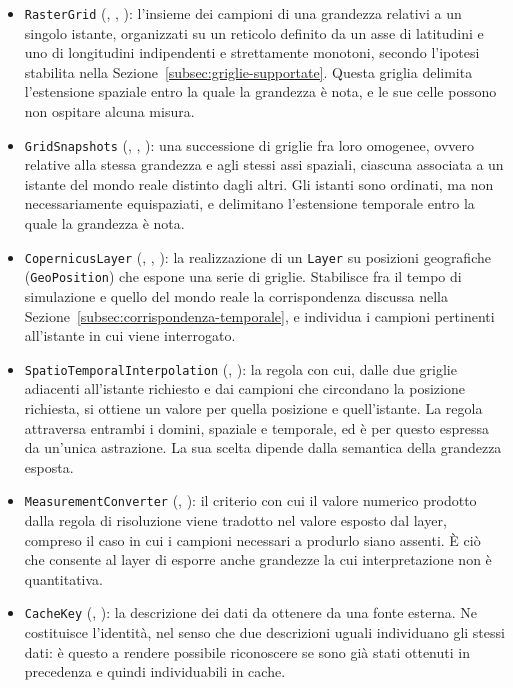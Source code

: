 \begin{itemize}
    \item \texttt{RasterGrid} (, , ): l'insieme dei campioni di una
    grandezza relativi a un singolo istante, organizzati su un reticolo definito da un asse
    di latitudini e uno di longitudini indipendenti e strettamente monotoni, secondo
    l'ipotesi stabilita nella Sezione~\ref{subsec:griglie-supportate}. Questa griglia
    delimita l'estensione spaziale entro la quale la grandezza è nota, e le sue celle
    possono non ospitare alcuna misura.

    \item \texttt{GridSnapshots} (, , ): una successione di griglie
    fra loro omogenee, ovvero relative alla stessa grandezza e agli stessi assi spaziali,
    ciascuna associata a un istante del mondo reale distinto dagli altri. Gli istanti sono
    ordinati, ma non necessariamente equispaziati, e delimitano l'estensione temporale
    entro la quale la grandezza è nota.

    \item \texttt{CopernicusLayer} (, , ): la realizzazione di un
    \texttt{Layer} su posizioni geografiche (\texttt{GeoPosition}) che espone una serie di
    griglie. Stabilisce fra il tempo di simulazione e quello del mondo reale la
    corrispondenza discussa nella Sezione~\ref{subsec:corrispondenza-temporale}, e
    individua i campioni pertinenti all'istante in cui viene interrogato.

    \item \texttt{SpatioTemporalInterpolation} (, ): la regola con cui,
    dalle due griglie adiacenti all'istante richiesto e dai campioni che circondano la
    posizione richiesta, si ottiene un valore per quella posizione e quell'istante. La
    regola attraversa entrambi i domini, spaziale e temporale, ed è per questo espressa da
    un'unica astrazione. La sua scelta dipende dalla semantica della grandezza esposta.

    \item \texttt{MeasurementConverter} (, ): il criterio con cui il valore
    numerico prodotto dalla regola di risoluzione viene tradotto nel valore esposto dal
    layer, compreso il caso in cui i campioni necessari a produrlo siano assenti. È ciò che
    consente al layer di esporre anche grandezze la cui interpretazione non è quantitativa.

    \item \texttt{CacheKey} (, ): la descrizione dei dati da ottenere da
    una fonte esterna. Ne costituisce l'identità, nel senso che due descrizioni uguali
    individuano gli stessi dati: è questo a rendere possibile riconoscere se sono già stati
    ottenuti in precedenza e quindi individuabili in cache.


\end{itemize}
